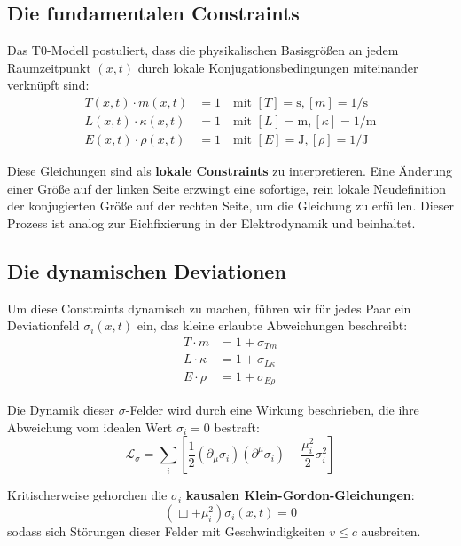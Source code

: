 \documentclass[10pt, a4paper]{article}
\begin{document}
	\subsection{Die fundamentalen Constraints}
	Das T0-Modell postuliert, dass die physikalischen Basisgrößen an jedem Raumzeitpunkt $(x,t)$ durch lokale Konjugationsbedingungen miteinander verknüpft sind:
	\begin{align}
		T(x,t) \cdot m(x,t) &= 1 \quad \text{mit } [T] = \text{s}, [m] = 1/\text{s} \label{eq:conj1} \\
		L(x,t) \cdot \kappa(x,t) &= 1 \quad \text{mit } [L] = \text{m}, [\kappa] = 1/\text{m} \label{eq:conj2} \\
		E(x,t) \cdot \rho(x,t) &= 1 \quad \text{mit } [E] = \text{J}, [\rho] = 1/\text{J} \label{eq:conj3}
	\end{align}
	
	Diese Gleichungen sind als \textbf{lokale Constraints} zu interpretieren. Eine Änderung einer Größe auf der linken Seite erzwingt eine sofortige, rein lokale Neudefinition der konjugierten Größe auf der rechten Seite, um die Gleichung zu erfüllen. Dieser Prozess ist analog zur Eichfixierung in der Elektrodynamik und beinhaltet.
	
	\subsection{Die dynamischen Deviationen}
	Um diese Constraints dynamisch zu machen, führen wir für jedes Paar ein Deviationfeld $\sigma_i(x,t)$ ein, das kleine erlaubte Abweichungen beschreibt:
	\begin{align}
		T \cdot m &= 1 + \sigma_{Tm} \label{eq:sigma_tm} \\
		L \cdot \kappa &= 1 + \sigma_{L\kappa} \label{eq:sigma_lk} \\
		E \cdot \rho &= 1 + \sigma_{E\rho} \label{eq:sigma_er}
	\end{align}
	
	Die Dynamik dieser $\sigma$-Felder wird durch eine Wirkung beschrieben, die ihre Abweichung vom idealen Wert $\sigma_i = 0$ bestraft:
	\begin{equation}
		\mathcal{L}_{\sigma} = \sum_i \left[ \frac{1}{2} (\partial_\mu \sigma_i)(\partial^\mu \sigma_i) - \frac{\mu_i^2}{2} \sigma_i^2 \right] \label{eq:L_sigma}
	\end{equation}
	
	Kritischerweise gehorchen die $\sigma_i$ \textbf{kausalen Klein-Gordon-Gleichungen}:
	\begin{equation}
		(\Box + \mu_i^2) \sigma_i(x,t) = 0 \label{eq:kg}
	\end{equation}
	sodass sich Störungen dieser Felder mit Geschwindigkeiten $v \leq c$ ausbreiten.
	
\end{document}
